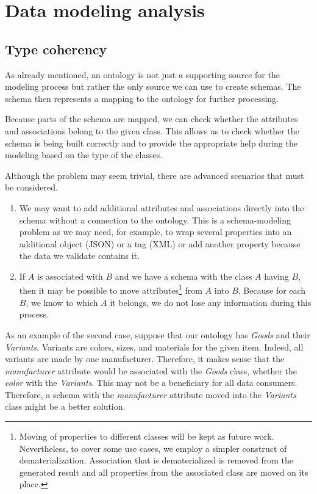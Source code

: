 \section{Data modeling analysis}

\subsection{Type coherency}\label{subsection:type-coherency}

As already mentioned, an ontology is not just a supporting source for the modeling process but rather the only source we can use to create schemas. The schema then represents a mapping to the ontology for further processing.

Because parts of the schema are mapped, we can check whether the attributes and associations belong to the given class. This allows us to check whether the schema is being built correctly and to provide the appropriate help during the modeling based on the type of the classes.

Although the problem may seem trivial, there are advanced scenarios that must be considered.

\begin{enumerate}
  \item We may want to add additional attributes and associations directly into the schema without a connection to the ontology. This is a schema-modeling problem as we may need, for example, to wrap several properties into an additional object (JSON) or a tag (XML) or add another property because the data we validate contains it.
  \item If $A$ is associated with $B$ and we have a schema with the class $A$ having $B$, then it may be possible to move attributes\footnote{Moving of properties to different classes will be kept as future work. Nevertheless, to cover some use cases, we employ a simpler construct of dematerialization. Association that is dematerialized is removed from the generated result and all properties from the associated class are moved on its place.} from $A$ into $B$. Because for each $B$, we know to which $A$ it belongs, we do not lose any information during this process.
\end{enumerate}

As an example of the second case, suppose that our ontology has \textit{Goods} and their \textit{Variants}. Variants are colors, sizes, and materials for the given item. Indeed, all variants are made by one manufacturer. Therefore, it makes sense that the \textit{manufacturer} attribute would be associated with the \textit{Goods} class, whether the \textit{color} with the \textit{Variants}. This may not be a beneficiary for all data consumers. Therefore, a schema with the \textit{manufacturer} attribute moved into the \textit{Variants} class might be a better solution.

